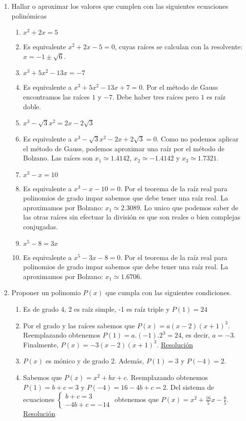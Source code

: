 \documentclass[a4paper]{article}
\newcommand{\answer}{\item[**]}
\newcommand{\exercise}{\item}
\newcommand{\SEL}[1]{\left\{\begin{matrix} #1 \end{matrix}\right.}
\newcommand{\df}[2]{\displaystyle\frac{#1}{#2}}
\begin{document}
\begin{enumerate}
	\exercise Hallar o aproximar los valores que cumplen con las siguientes ecuaciones polinómicas 

	\begin{multicols}{2}
	\begin{enumerate} [label=(\alph*)]
		
		\item $x^2+2x=5$
		\answer Es equivalente $x^2+2x-5=0$, cuyas raíces se calculan con la resolvente: $x=-1\pm\sqrt{6}$.

		\item $x^3+5x^2-13x = -7$
		\answer Es equivalente a $x^3+5x^2-13x +7 =0$. Por el método de Gauss encontramos las raíces $1$ y $-7$. Debe haber tres raíces pero $1$ es raíz doble.

		\item $x^3 -\sqrt{3}x^2 = 2x - 2\sqrt{3}$
		\answer Es equivalente a $x^3 -\sqrt{3}x^2 - 2x + 2\sqrt{3} = 0$. Como no podemos aplicar el método de Gauss, podemos aproximar una raíz por el método de Bolzano. Las raíces son $x_1 \simeq 1.4142$, $x_2 \simeq -1.4142$ y $x_3 \simeq 1.7321$.

		\item $x^3-x=10$
		\answer Es equivalente a $x^3-x-10=0$. Por el teorema de la raíz real para polinomios de grado impar sabemos que debe tener una raíz real. La aproximamos por Bolzano: $x_1 \simeq 2.3089$. Lo unico que podemos saber de las otras raíces sin efectuar la división es que son reales o bien complejas conjugadas.

		\item $x^5-8=3x$
		\answer Es equivalente a $x^5-3x-8=0$. Por el teorema de la raíz real para polinomios de grado impar sabemos que debe tener una raíz real. La aproximamos por Bolzano: $x_1 \simeq 1.6706$. 

	\end{enumerate}
	\end{multicols}


	\exercise Proponer un polinomio $P(x)$ que cumpla con las siguientes condiciones.
	\begin{enumerate} [label=(\alph*)]
		
		\item Es de grado 4, 2 es raíz simple, -1 es raíz triple y $P(1)=24$
		\answer Por el grado y las raíces sabemos que $P(x)=a(x-2)(x+1)^3$. Reemplazando obtenemos $P(1)=a.(-1).2^3=24$, es decir, $a=-3$. Finalmente, $P(x)=-3(x-2)(x+1)^3$. \href{https://youtu.be/_XVYatmUKBg}{Resolución}

		\item $P(x)$ es mónico y de grado 2. Además, $P(1)=3$ y $P(-4)=2$.
		\answer Sabemos que $P(x)=x^2+bx+c$. Reemplazando obtenemos $P(1)=b+c=3$ y $P(-4)=16-4b+c=2$. Del sistema de ecuaciones $\SEL{b+c=3 \\ -4b+c=-14}$ obtenemos que $P(x)=x^2+\df{16}{5}x-\df{6}{5}$. \href{https://youtu.be/LDpq_f-baPc}{Resolución}


\end{enumerate}
\end{enumerate}
\end{document}
